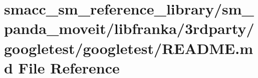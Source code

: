 \hypertarget{smacc__sm__reference__library_2sm__panda__moveit_2libfranka_23rdparty_2googletest_2googletest_2README_8md}{}\section{smacc\+\_\+sm\+\_\+reference\+\_\+library/sm\+\_\+panda\+\_\+moveit/libfranka/3rdparty/googletest/googletest/\+R\+E\+A\+D\+ME.md File Reference}
\label{smacc__sm__reference__library_2sm__panda__moveit_2libfranka_23rdparty_2googletest_2googletest_2README_8md}
